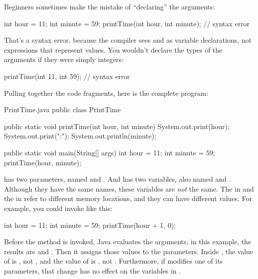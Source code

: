 Beginners sometimes make the mistake of ``declaring'' the arguments:

\begin{code}
int hour = 11;
int minute = 59;
printTime(int hour, int minute);  // syntax error
\end{code}

That's a syntax error, because the compiler sees  and  as variable declarations, not expressions that represent values.
You wouldn't declare the types of the arguments if they were simply integers:

\begin{code}
printTime(int 11, int 59);  // syntax error
\end{code}

Pulling together the code fragments, here is the complete program:


\begin{trinket}[340]{PrintTime.java}
public class PrintTime {

    public static void printTime(int hour, int minute) {
        System.out.print(hour);
        System.out.print(":");
        System.out.println(minute);
    }

    public static void main(String[] args) {
        int hour = 11;
        int minute = 59;
        printTime(hour, minute);
    }
}
\end{trinket}

 has two parameters, named  and .
And  has two variables, also named  and .
Although they have the same names, these variables are {\em not} the same.
The  in  and the  in  refer to different memory locations, and they can have different values.
For example, you could invoke  like this:

\begin{code}
int hour = 11;
int minute = 59;
printTime(hour + 1, 0);
\end{code}

Before the method is invoked, Java evaluates the arguments; in this example, the results are  and .
Then it assigns those values to the parameters.
Inside , the value of  is , not , and the value of  is , not .
Furthermore, if  modifies one of its parameters, that change has no effect on the variables in .


